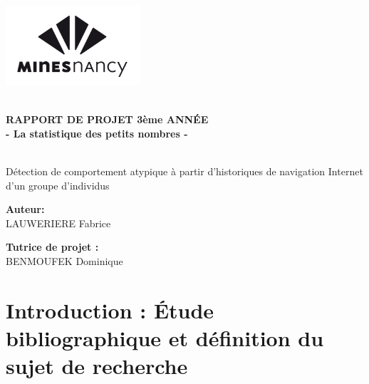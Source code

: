 \documentclass[a4paper, 11pt]{article}
\begin{document}

\begin{titlepage}
\includegraphics[width=5cm]{images/logo_mines.jpg}
\vspace{6cm}
\begin{center}
\hrulefill\\
{\LARGE \textbf{RAPPORT DE PROJET 3ème ANNÉE\\ - La statistique des petits nombres -\\}}
\hrulefill\\

\vspace{1cm}

{\Large Détection de comportement atypique à partir d'historiques de navigation Internet d'un groupe d'individus}
\vspace{2cm}

\begin{minipage}{5cm}
\begin{center}
\textbf{Auteur:}\\
LAUWERIERE Fabrice
\end{center}
\end{minipage}
\hspace{1cm}
\begin{minipage}{5cm}
\begin{center}
\textbf{Tutrice de projet :}\\
BENMOUFEK Dominique
\end{center}
\end{minipage}
\end{center}
\end{titlepage} 

\tableofcontents




\pagestyle{fancy}
\fancyhead[L]{\leftmark}
\fancyhead[C]{}
\fancyhead[R]{}
\fancyfoot[C]{}
\fancyfoot[R]{\thepage}



\newpage

\section{Introduction : Étude bibliographique et définition du sujet de recherche}
\end{document}
